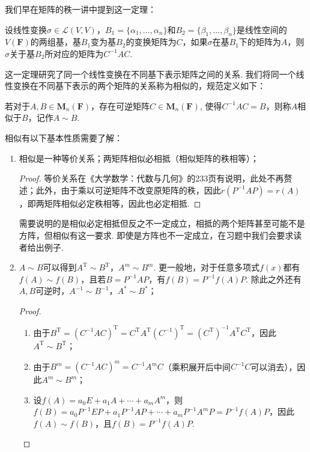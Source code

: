 我们早在矩阵的秩一讲中提到这一定理：
\begin{theorem}[基的选择对映射矩阵的影响]
    设线性变换$\sigma \in \mathcal{L}(V,V)$，$B_1=\{\alpha_1,\ldots,\alpha_n\}$和$B_2=\{\beta_1,\ldots,\beta_n\}$是线性空间的$V(\mathbf{F})$的两组基，基$B_1$变为基$B_2$的变换矩阵为$C$，如果$\sigma$在基$B_1$下的矩阵为$A$，则$\sigma$关于基$B_2$所对应的矩阵为$C^{-1}AC$.
\end{theorem}
这一定理研究了同一个线性变换在不同基下表示矩阵之间的关系. 我们将同一个线性变换在不同基下表示的两个矩阵的关系称为相似的，规范定义如下：
\begin{definition}
    若对于$A,B\in \mathbf{M}_n(\mathbf{F})$，存在可逆矩阵$C\in \mathbf{M}_n(\mathbf{F})$, 使得$C^{-1}AC=B$，则称$A$相似于$B$，记作$A\sim B$.
\end{definition}
相似有以下基本性质需要了解：
\begin{enumerate}
    \item 相似是一种等价关系；两矩阵相似必相抵（相似矩阵的秩相等）；

          \begin{proof}
              等价关系在《大学数学：代数与几何》的233页有说明，此处不再赘述；此外，由于乘以可逆矩阵不改变原矩阵的秩，因此$r(P^{-1}AP)=r(A)$，即两矩阵相似必定秩相等，因此也必定相抵.
          \end{proof}

          需要说明的是相似必定相抵但反之不一定成立，相抵的两个矩阵甚至可能不是方阵，但相似有这一要求. 即使是方阵也不一定成立，在习题中我们会要求读者给出例子.

    \item $A\sim B$可以得到$A^\mathrm{T}\sim B^\mathrm{T}$，$A^m\sim B^m$. 更一般地，对于任意多项式$f(x)$都有$f(A)\sim f(B)$，且若$B=P^{-1}AP$，有$f(B)=P^{-1}f(A)P$. 除此之外还有$A,B$可逆时，$A^{-1}\sim B^{-1}$，$A^*\sim B^*$；

          \begin{proof}
              \begin{enumerate}
                  \item 由于$B^\mathrm{T}=(C^{-1}AC)^\mathrm{T}=C^\mathrm{T}A^\mathrm{T}(C^{-1})^\mathrm{T}=(C^\mathrm{T})^{-1}A^\mathrm{T}C^\mathrm{T}$，因此$A^\mathrm{T}\sim B^\mathrm{T}$；

                  \item 由于$B^m=(C^{-1}AC)^m=C^{-1}A^mC$（乘积展开后中间$C^{-1}C$可以消去），因此$A^m\sim B^m$；

                  \item 设$f(A)=a_0E+a_1A+\cdots+a_mA^m$，则$f(B)=a_0P^{-1}EP+a_1P^{-1}AP+\cdots+a_mP^{-1}A^mP=P^{-1}f(A)P$，因此$f(A)\sim f(B)$，且$f(B)=P^{-1}f(A)P$.


\end{enumerate}
\end{proof}
\end{enumerate}
